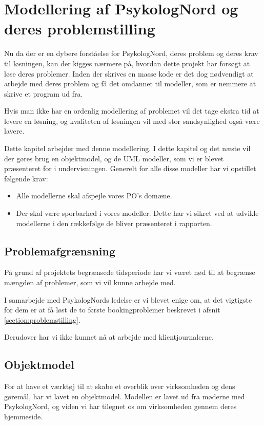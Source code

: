 \section{Modellering af PsykologNord og deres problemstilling}
\label{kabitel:ModelleringPN}

Nu da der er en dybere forståelse for PsykologNord, deres problem og deres krav til løsningen, kan der kigges nærmere på, hvordan dette projekt har forsøgt at løse deres problemer.
Inden der skrives en masse kode er det dog nødvendigt at arbejde med deres problem og få det omdannet til modeller, som er nemmere at skrive et program ud fra.

Hvis man ikke har en ordenlig modellering af problemet vil det tage ekstra tid at levere en løsning, og kvaliteten af løsningen vil med stor sandsynlighed også være lavere.

Dette kapitel arbejder med denne modellering.
I dette kapitel og det næste vil der gøres brug en objektmodel, og de UML modeller, som vi er blevet præsenteret for i undervisningen.
Generelt for alle disse modeller har vi opstillet følgende krav:

\begin{itemize}
    \item Alle modellerne skal afspejle vores PO's domæne.
    \item Der skal være sporbarhed i vores modeller. Dette har vi sikret ved at udvikle modellerne i den rækkefølge de bliver præsenteret i rapporten.
\end{itemize}


\subsection{Problemafgrænsning}
\label{problemafgraensning}
På grund af projektets begrænsede tidsperiode har vi været nød til at begrænse mængden af problemer, som vi vil kunne arbejde med.

I samarbejde med PsykologNords ledelse er vi blevet enige om, at det vigtigste for dem er at få løst de to første bookingproblemer beskrevet i afsnit \ref{section:problemstilling}.

Derudover har vi ikke kunnet nå at arbejde med klientjournalerne.

\subsection{Objektmodel}
\label{objektmodel}

For at have et værktøj til at skabe et overblik over virksomheden og dens gøremål, har vi lavet en objektmodel.
Modellen er lavet ud fra møderne med PsykologNord, og viden vi har tilegnet os om virksomheden gennem deres hjemmeside.\cite{psykolognord}

